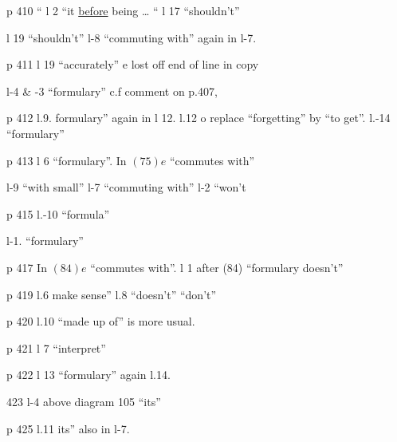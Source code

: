p 410  `` \quad l 2 ``it \uline{before} being \ldots{} `` \quad l 17 ``shouldn't''

l 19 ``shouldn't'' \quad l-8 ``commuting with'' again in l-7.

p 411 l 19 ``accurately'' \quad e lost off end of line in copy 

l-4 \& -3 ``formulary'' c.f comment on p.407,

p 412 l.9. formulary'' again in l 12. \quad l.12 o replace ``forgetting'' by ``to get''. \quad l.-14 ``formulary''

p 413 l 6 ``formulary''. \quad In $(75)e$ ``commutes with''

l-9 ``with small'' \quad l-7 ``commuting with'' \quad l-2 ``won't

p 415 l.-10 ``formula''

 l-1. ``formulary''

p 417 In $(84)e$ ``commutes with''. \quad l 1 after (84) ``formulary doesn't''

p 419 l.6 make sense'' \quad l.8 ``doesn't'' \quad ``don't''

p 420 l.10 ``made up of'' is more usual.

p 421 l 7 ``interpret''

p 422 l 13 ``formulary'' again  l.14.

 423 l-4 above diagram 105 ``its''

p 425 l.11 its'' also in l-7.
